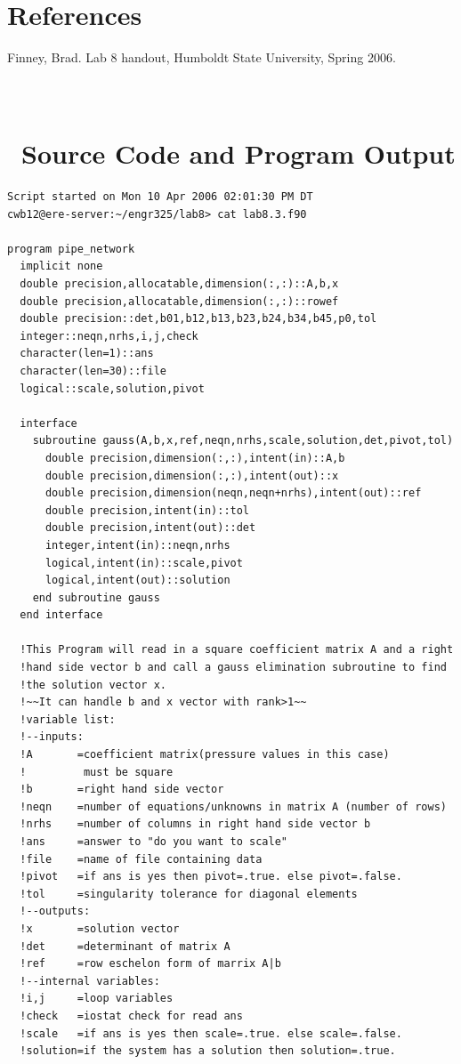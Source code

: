 \documentclass[titlepage,12pt,onehalfspacing]{article}
\begin{document}
\section{References}
Finney, Brad. Lab 8 handout, Humboldt State University, Spring 2006.

\appendix
\newcommand{\appsection}[1]{\let\oldthesection\thesection
  \renewcommand{\thesection}{Appendix \oldthesection}
  \section{#1}\let\thesection\oldthesection}
\appsection{\\~Source Code and Program Output} \label{sec:source}
\begin{singlespacing}
\begin{Verbatim}[frame=single]
Script started on Mon 10 Apr 2006 02:01:30 PM DT
cwb12@ere-server:~/engr325/lab8> cat lab8.3.f90

program pipe_network
  implicit none
  double precision,allocatable,dimension(:,:)::A,b,x
  double precision,allocatable,dimension(:,:)::rowef
  double precision::det,b01,b12,b13,b23,b24,b34,b45,p0,tol
  integer::neqn,nrhs,i,j,check
  character(len=1)::ans
  character(len=30)::file
  logical::scale,solution,pivot

  interface
    subroutine gauss(A,b,x,ref,neqn,nrhs,scale,solution,det,pivot,tol)
      double precision,dimension(:,:),intent(in)::A,b
      double precision,dimension(:,:),intent(out)::x
      double precision,dimension(neqn,neqn+nrhs),intent(out)::ref
      double precision,intent(in)::tol
      double precision,intent(out)::det
      integer,intent(in)::neqn,nrhs
      logical,intent(in)::scale,pivot
      logical,intent(out)::solution
    end subroutine gauss
  end interface

  !This Program will read in a square coefficient matrix A and a right
  !hand side vector b and call a gauss elimination subroutine to find
  !the solution vector x.
  !~~It can handle b and x vector with rank>1~~
  !variable list:
  !--inputs:
  !A       =coefficient matrix(pressure values in this case)
  !         must be square
  !b       =right hand side vector
  !neqn    =number of equations/unknowns in matrix A (number of rows)
  !nrhs    =number of columns in right hand side vector b
  !ans     =answer to "do you want to scale"
  !file    =name of file containing data
  !pivot   =if ans is yes then pivot=.true. else pivot=.false.
  !tol     =singularity tolerance for diagonal elements
  !--outputs:
  !x       =solution vector
  !det     =determinant of matrix A
  !ref     =row eschelon form of marrix A|b
  !--internal variables:
  !i,j     =loop variables
  !check   =iostat check for read ans
  !scale   =if ans is yes then scale=.true. else scale=.false.
  !solution=if the system has a solution then solution=.true.


\end{Verbatim}
\end{singlespacing}
\end{document}
